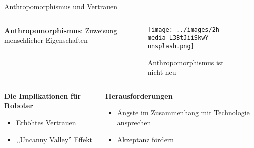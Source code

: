 \documentclass[aspectratio=169]{beamer}
\begin{document}
\begin{frame}{Anthropomorphismus und Vertrauen}
  \begin{columns}
    \begin{column}{.5\textwidth}
      \textbf{Anthropomorphismus}: Zuweisung menschlicher Eigenschaften
    \end{column}
    \begin{column}{.5\textwidth}
      \begin{figure}[h]
        \centering
        \texttt{[image: ../images/2h-media-L3BtJiiSkwY-unsplash.png]}
        \caption{Anthropomorphismus ist nicht neu}
      \end{figure}
    \end{column}
  \end{columns}

  \begin{columns}
    \begin{column}{.5\textwidth}
      \textbf{Die Implikationen für Roboter}
      \begin{itemize}
        \item Erhöhtes Vertrauen
        \item ,,Uncanny Valley'' Effekt
      \end{itemize}
    \end{column}
    \begin{column}{.5\textwidth}
      \textbf{Herausforderungen}
      \begin{itemize}
        \item Ängste im Zusammenhang mit Technologie ansprechen
        \item Akzeptanz fördern
      \end{itemize}
    \end{column}
  \end{columns}

\end{frame}
\end{document}
